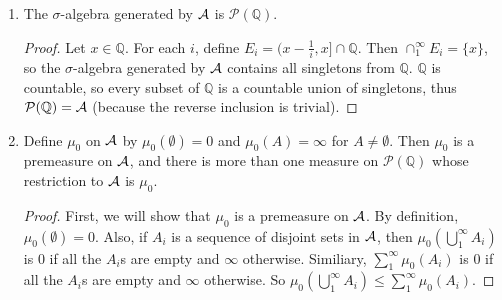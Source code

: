 \documentclass[10pt]{article}
\newcommand{\Q}{\mathbb{Q}}
\renewcommand{\P}{\mathcal{P}}
\begin{document}
\begin{enumerate}
\begin{enumerate}
\begin{proof}
We have shown both inclusions, therefore $\A$ equals the algebra of finite disjoint unions from $\E$, and is thus an algebra.

\begin{comment}
It suffices to show that $\B$ is an elementary family.  This will mean that the collection of finite \emph{disjoint} unions of sets from $\B$ is an algebra.  But any finite union $A_1 \cup \cdots \cup A_n$ of sets from $\B$  is equal to the finite disjoint union $(A_1 \setminus \bigcup_{i \neq 1} A_i) \cup \cdots \cup (A_n \setminus \bigcup_{i \neq n} A_i)$.  Now, if we assume the inductive hypothesis that any union of $n-1$ sets from $\B$ equals some disjoint unions of sets from $\B$, then we know for each $j \in \{1, \dots , n\}$ that $\bigcup_{i \neq j} A_i$ is in the algebra generated by $\B$, and thus so is $A_j \setminus \bigcup_{i \neq j} A_i$.  The base case clearly holds, since the empty union is a disjoint union.
\end{comment}

\end{proof}

\item The $\sigma$-algebra generated by $\A$ is $\P(\Q)$.

\begin{proof}

Let $x \in \Q$.  For each $i$, define $E_i = (x - \frac1i, x] \cap \Q$.  Then $\cap_1^\infty E_i = \{x\}$, so the $\sigma$-algebra generated by $\A$ contains all singletons from $\Q$.  $\Q$ is countable, so every subset of $\Q$ is a countable union of singletons, thus $\P(\Q) = \A$ (because the reverse inclusion is trivial).

\end{proof}

\item Define $\mu_0$ on $\A$ by $\mu_0(\emptyset) = 0$ and $\mu_0(A) = \infty$ for $A \neq \emptyset$.  Then $\mu_0$ is a premeasure on $\A$, and there is more than one measure on $\P(\Q)$ whose restriction to $\A$ is $\mu_0$.

\begin{proof}
First, we will show that $\mu_0$ is a premeasure on $\A$.  By definition, $\mu_0(\emptyset) = 0$.  Also, if $A_i$ is a sequence of disjoint sets in $\A$, then $\mu_0(\bigcup_1^\infty A_i)$ is $0$ if all the $A_i$s are empty and $\infty$ otherwise.  Similiary, $\sum_1^\infty \mu_0(A_i)$ is $0$ if all the $A_i$s are empty and $\infty$ otherwise.  So $\mu_0(\bigcup_1^\infty A_i) \leq \sum_1^\infty \mu_0(A_i)$.


\end{proof}
\end{enumerate}
\end{enumerate}
\end{document}
